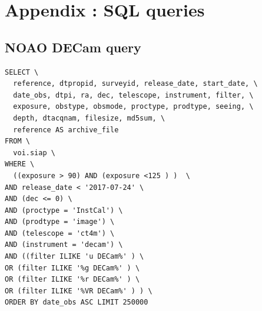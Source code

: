 \documentclass[DM,lsstdraft,toc,usenatbib]{lsstdoc}
\begin{document}
\appendix
\section{Appendix : SQL queries}

\subsection{NOAO DECam query}
\label{sec:sql_noao_decam}
\begin{lstlisting}
SELECT \
  reference, dtpropid, surveyid, release_date, start_date, \
  date_obs, dtpi, ra, dec, telescope, instrument, filter, \
  exposure, obstype, obsmode, proctype, prodtype, seeing, \
  depth, dtacqnam, filesize, md5sum, \
  reference AS archive_file
FROM \
  voi.siap \
WHERE \
  ((exposure > 90) AND (exposure <125 ) )  \
AND release_date < '2017-07-24' \
AND (dec <= 0) \
AND (proctype = 'InstCal') \
AND (prodtype = 'image') \
AND (telescope = 'ct4m') \
AND (instrument = 'decam') \
AND ((filter ILIKE 'u DECam%' ) \
OR (filter ILIKE '%g DECam%' ) \
OR (filter ILIKE '%r DECam%' ) \
OR (filter ILIKE '%VR DECam%' ) ) \
ORDER BY date_obs ASC LIMIT 250000
\end{lstlisting}




\end{document}
